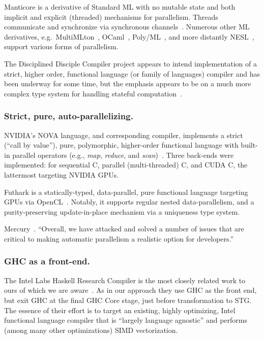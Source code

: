 \documentclass{llncs}
\begin{document}
Manticore is a derivative of Standard ML with no mutable state and both
implicit and explicit (threaded) mechanisms for parallelism.  Threads
communicate and synchronize via synchronous channels~\cite{Manticore}.
Numerous other ML derivatives, e.g.\ MultiMLton~\cite{MultiMLton},
OCaml~\cite{OCaml}, Poly/ML~\cite{PolyML}, and more distantly
NESL~\cite{NESL}, support various forms of parallelism.

The Disciplined Disciple Compiler project appears to intend implementation of
a strict, higher order, functional language (or family of languages) compiler
and has been underway for some time, but the emphasis appears to be on a much
more complex type system for handling stateful computation~\cite{disciplined-disciple}.

\vspace{-0.1in}
\subsubsection{Strict, pure, auto-parallelizing.}
NVIDIA's NOVA language, and corresponding compiler, implements a strict
(``call by value''), pure, polymorphic, higher-order functional language with
built-in parallel operators (e.g., \emph{map}, \emph{reduce}, and
\emph{scan})~\cite{NVIDIA:2013}. Three back-ends were implemented: for
sequential C, parallel (multi-threaded) C, and CUDA C, the lattermost
targeting NVIDIA GPUs.  

Futhark is a statically-typed, data-parallel,
pure functional language targeting GPUs via OpenCL~\cite{Futhark}.  Notably, it
supports regular nested data-parallelism, and a purity-preserving
update-in-place mechanism via a uniqueness type system.

Mercury~\cite{bone12:autoparallelism_thesis}.  ``Overall, we have attacked and solved a number of issues that are critical to making automatic parallelism a realistic option for developers.''

\vspace{-0.1in}
\subsubsection{GHC as a front-end.}
The Intel Labs Haskell Research Compiler is the most closely related work to ours
of which we are aware~\cite{Liu:2013,Petersen:2013}.  As in our approach they
use GHC as the front end, but exit GHC at the final GHC Core stage, just
before transformation to STG.  The essence of their effort is to target an
existing, highly optimizing, Intel functional language compiler that is
``largely language agnostic'' and performs (among many other optimizations)
SIMD vectorization.
\end{document}
